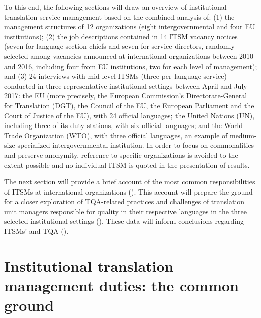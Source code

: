\documentclass[output=paper]{langsci/langscibook}
\begin{document}
To this end, the following sections will draw an overview of institutional translation service management based on the combined analysis of: (1) the management structures of 12 organizations (eight intergovernmental and four EU institutions); (2) the job descriptions contained in 14 ITSM vacancy notices (seven for language section chiefs and seven for service directors, randomly selected among vacancies announced at international organizations between 2010 and 2016, including four from EU institutions, two for each level of management); and (3) 24 interviews with mid-level ITSMs (three per language service) conducted in three representative institutional settings between April and July 2017: the EU (more precisely, the European Commission’s Directorate-General for Translation (DGT), the Council of the EU, the European Parliament and the Court of Justice of the EU), with 24 official languages; the United Nations (UN), including three of its duty stations, with six official languages; and the World Trade Organization (WTO), with three official languages, an example of medium-size specialized intergovernmental institution. In order to focus on commonalities and preserve anonymity, reference to specific organizations is avoided to the extent possible and no individual ITSM is quoted in the presentation of results.



The next section will provide a brief account of the most common responsibilities of ITSMs at international organizations (). This account will prepare the ground for a closer exploration of TQA-related practices and challenges of translation unit managers responsible for quality in their respective languages in the three selected institutional settings (). These data will inform conclusions regarding ITSMs’ and TQA ().  



\section{Institutional translation management duties: the common ground}\label{sec:prietoramos:2}
\end{document}
